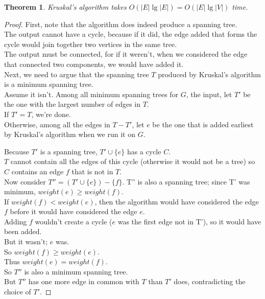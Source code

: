 \documentclass[12pt]{article}
\theoremstyle{plain}
\newtheorem{theorem}{Theorem}[subsection]
\theoremstyle{definition}
\begin{document}
\begin{theorem}
Kruskal's algorithm takes $O(|E|\lg{|E|}) = O(|E|\lg{|V|})$ time.
\end{theorem}
\begin{proof}
First, note that the algorithm does indeed produce a spanning tree. \\
The output cannot have a cycle, because if it did, the edge added that forms the cycle would join together two vertices in the same tree. \\
The output must be connected, for if it weren't, when we considered the edge that connected two components, we would have added it. \\

Next, we need to argue that the spanning tree $T$ produced by Kruskal's algorithm is a minimum spanning tree. \\
Assume it isn't.
Among all minimum spanning trees for $G$, the input, let $T'$ be the one with the largest number of edges in $T$. \\
If $T' = T$, we're done. \\
Otherwise, among all the edges in $T - T'$, let $e$ be the one that is added earliest by Kruskal's algorithm when we run it on $G$.

Because $T'$ is a spanning tree, $T' \cup \{e\}$ has a cycle $C$. \\
$T$ cannot contain all the edges of this cycle (otherwise it would not be a tree) so $C$ contains an edge $f$ that is not in $T$. \\
Now consider $T'' = (T' \cup \{e\}) - \{f\}$. T'' is also a spanning tree;
since T' was minimum, $weight(e) \geq weight(f)$. \\

If $weight(f) < weight(e)$, then the algorithm would have considered the edge $f$ before it would have considered the edge $e$. \\
Adding $f$ wouldn't create a cycle ($e$ was the first edge not in T'), so it would have been added. \\
But it wasn't;
$e$ was. \\
So $weight(f) \geq weight(e)$. \\
Thus $weight(e) = weight(f)$. \\

So $T''$ is also a minimum spanning tree. \\
But $T''$ has one more edge in common with $T$ than $T'$ does, contradicting the choice of $T'$.
\end{proof}
\end{document}
